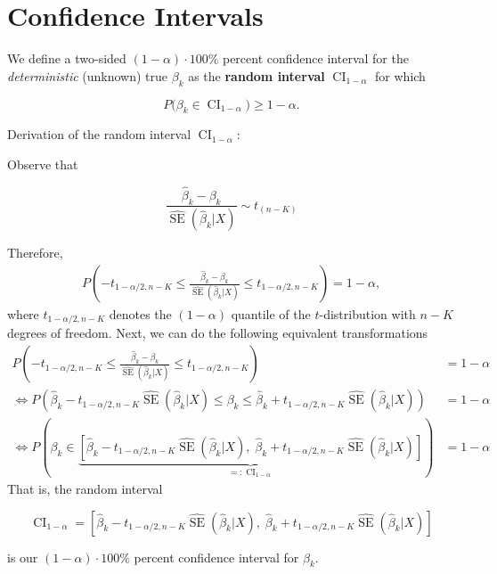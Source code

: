 \documentclass[
  letterpaper,
  DIV=11,
  numbers=noendperiod]{scrreprt}
\theoremstyle{definition}
\theoremstyle{plain}
\theoremstyle{plain}
\theoremstyle{remark}
\begin{document}
\hypertarget{sec-CIsmallsample}{%
\section{Confidence Intervals}\label{sec-CIsmallsample}}

We define a two-sided \((1-\alpha)\cdot 100\%\) percent confidence
interval for the \emph{deterministic} (unknown) true \(\beta_k\) as the
\textbf{random interval} \(\operatorname{CI}_{1-\alpha}\) for which

\[
P\Big(\beta_k\in\operatorname{CI}_{1-\alpha}\Big)\geq 1-\alpha.
\]

Derivation of the random interval \(\operatorname{CI}_{1-\alpha}\):

Observe that

\[
\frac{\hat\beta_k-\beta_k}{\widehat{\operatorname{SE}}(\hat\beta_k|X)}\sim t_{(n-K)}
\]

Therefore, \begin{align*}
P\left(-t_{1-\alpha/2,n-K}\leq\frac{\hat\beta_k-\beta_k}{\widehat{\operatorname{SE}}(\hat\beta_k|X)}\leq t_{1-\alpha/2,n-K}\right)=1-\alpha,
\end{align*} where \(t_{1-\alpha/2,n-K}\) denotes the \((1-\alpha)\)
quantile of the \(t\)-distribution with \(n-K\) degrees of freedom.
Next, we can do the following equivalent transformations \begin{align*}
P\left(-t_{1-\alpha/2,n-K}\leq\frac{\hat\beta_k-\beta_k}{\widehat{\operatorname{SE}}(\hat\beta_k|X)}\leq t_{1-\alpha/2,n-K}\right)&=1-\alpha\\
\Leftrightarrow P\left(\hat\beta_k-t_{1-\alpha/2,n-K}\widehat{\operatorname{SE}}(\hat\beta_k|X)\leq \beta_k\leq\hat\beta_k +t_{1-\alpha/2,n-K}\widehat{\operatorname{SE}}(\hat\beta_k|X)\right)&=1-\alpha\\
\Leftrightarrow P\left(\beta_k\in\underbrace{\left[\hat\beta_k-t_{1-\alpha/2,n-K}\widehat{\operatorname{SE}}(\hat\beta_k|X),\;\hat\beta_k +t_{1-\alpha/2,n-K}\widehat{\operatorname{SE}}(\hat\beta_k|X)\right]}_{=:\operatorname{CI}_{1-\alpha}}\right)&=1-\alpha
\end{align*} That is, the random interval

\[
\operatorname{CI}_{1-\alpha}=\left[\hat\beta_k-t_{1-\alpha/2,n-K}\widehat{\operatorname{SE}}(\hat\beta_k|X),\;\hat\beta_k +t_{1-\alpha/2,n-K}\widehat{\operatorname{SE}}(\hat\beta_k|X)\right]
\]

is our \((1-\alpha)\cdot 100\%\) percent confidence interval for
\(\beta_k\).
\end{document}
